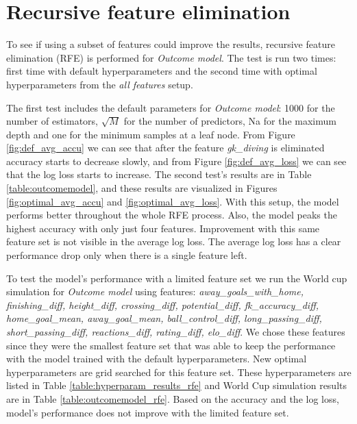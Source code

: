 \section{Recursive feature elimination}
To see if using a subset of features could improve the results, recursive feature elimination (RFE) is performed for \textit{Outcome model}. The test is run two times: first time with default hyperparameters and the second time with optimal hyperparameters from the \textit{all features} setup.

The first test includes the default parameters for \textit{Outcome model}: 1000 for the number of estimators, $\sqrt{M}$ for the number of predictors, Na for the maximum depth and one for the minimum samples at a leaf node. From Figure \ref{fig:def_avg_accu} we can see that after the feature \textit{gk\_diving} is eliminated accuracy starts to decrease slowly, and from Figure \ref{fig:def_avg_loss} we can see that the log loss starts to increase. The second test's results are in Table \ref{table:outcomemodel}, and these results are visualized in Figures \ref{fig:optimal_avg_accu} and \ref{fig:optimal_avg_loss}. With this setup, the model performs better throughout the whole RFE process. Also, the model peaks the highest accuracy with only just four features. Improvement with this same feature set is not visible in the average log loss. The average log loss has a clear performance drop only when there is a single feature left.

To test the model's performance with a limited feature set we run the World cup simulation for \textit{Outcome model} using features: \textit{away\_goals\_with\_home, finishing\_diff, height\_diff, crossing\_diff, potential\_diff, fk\_accuracy\_diff, home\_goal\_mean, away\_goal\_mean, ball\_control\_diff, long\_passing\_diff,  short\_passing\_diff, reactions\_diff, rating\_diff, elo\_diff}. We chose these features since they were the smallest feature set that was able to keep the performance with the model trained with the default hyperparameters. New optimal hyperparameters are grid searched for this feature set. These hyperparameters are listed in Table \ref{table:hyperparam_results_rfe} and World Cup simulation results are in Table \ref{table:outcomemodel_rfe}. Based on the accuracy and the log loss, model's performance does not improve with the limited feature set.

